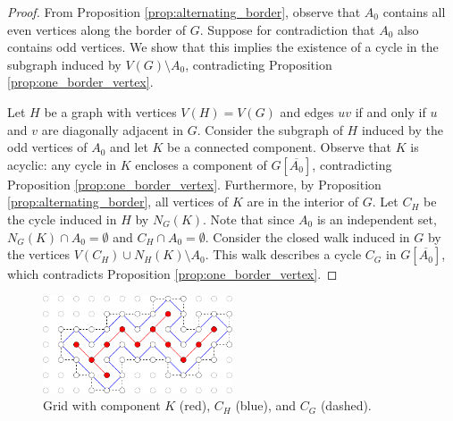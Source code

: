 \begin{proof}
From Proposition \ref{prop:alternating_border}, observe that $A_0$ contains all even vertices along the border of $G$. Suppose for contradiction that $A_0$ also contains odd vertices. We show that this implies the existence of a cycle in the subgraph induced by $V(G) \setminus A_0$, contradicting Proposition \ref{prop:one_border_vertex}. 

Let $H$ be a graph with vertices $V(H) = V(G)$ and edges $uv$ if and only if $u$ and $v$ are diagonally adjacent in $G$. Consider the subgraph of $H$ induced by the odd vertices of $A_0$ and let $K$ be a connected component. Observe that $K$ is acyclic: any cycle in $K$ encloses a component of $G[\overline{A_0}]$, contradicting Proposition \ref{prop:one_border_vertex}. Furthermore, by Proposition \ref{prop:alternating_border}, all vertices of $K$ are in the interior of $G$. Let $C_H$ be the cycle induced in $H$ by $N_G(K)$. Note that since $A_0$ is an independent set, $N_G(K) \cap A_0 = \emptyset$ and $C_H \cap A_0 = \emptyset$. Consider the closed walk induced in $G$ by the vertices $V(C_H) \cup N_H(K) \setminus A_0$. This walk describes a cycle $C_G$ in $G[\overline{A_0}]$, which contradicts Proposition \ref{prop:one_border_vertex}.
 \end{proof}

\begin{figure}[]
\centering
\includegraphics[width=0.5\textwidth]{figures/6/monochromatic.pdf}
\caption{Grid with component $K$ (red), $C_H$ (blue), and $C_G$ (dashed).}
\label{fig:border}
\end{figure} 
